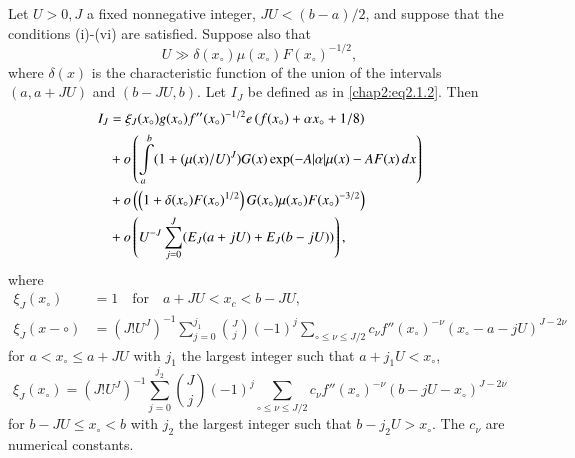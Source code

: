 \begin{thm}\label{chap2:thm2.2}
Let $U>0, J$ a fixed nonnegative integer, $JU<(b-a)/2$, and suppose
that the conditions (i)-(vi) are satisfied. Suppose also that 
\begin{equation}\label{chap2:eq2.1.10}
U\gg \delta(x_\circ)\mu(x_\circ)F(x_\circ)^{-1/2},
\end{equation}
where $\delta(x)$ is the characteristic function of the union of the
intervals $(a,a+JU)$ and $(b-JU,b)$. Let $I_J$ be defined as in
\eqref{chap2:eq2.1.2}. Then 
\begin{align}
I_J &= \xi_J(x_\circ)g(x_\circ)f''(x_\circ)^{-1/2}e\left(f(x_\circ)
+\alpha x_\circ+1/8\right)\label{chap2:eq2.1.11}\\
&+ o\left(\int\limits_a^b(1+(\mu(x)/U)^J)G(x)\exp(-A|\alpha|\mu (x)-AF
(x)\,dx\right)\notag\\
&+o\left(\left(1+\delta(x_\circ)F(x_\circ)^{1/2}\right)G(x_\circ)\mu
(x_\circ)F(x_\circ)^{-3/2}\right)\notag\\
& +o\left(U^{-J}\sum\limits_{j=0}^J(E_J(a+jU)+E_J(b-jU))\right),\notag
\end{align}\pageoriginale
where
\begin{align}
\xi_J(x_\circ) &= 1\quad\text{for}\quad
a+JU<x_c<b-JU,\label{chap2:eq2.1.12}\\
\xi_J(x-\circ) &= \left(J!U^J\right)^{-1}\sum\limits_{j=0}^{j_1}
\binom{J}{j}(-1)^j\sum\limits_{\circ\leq\nu\leq J/2}c_\nu f''
(x_\circ)^{-\nu}(x_\circ-a-jU)^{J-2\nu}\label{chap2:eq2.1.13}
\end{align}
for $a<x_\circ\leq a+JU$ with $j_1$ the largest integer such that
$a+j_1U<x_\circ$, 
\begin{equation}\label{chap2:eq2.1.14}
\xi_J(x_\circ)=(J!U^J)^{-1}\sum\limits_{j=0}^{j_2}\binom{J}{j}(-1)^j
\sum\limits_{\circ\leq\nu\leq J/2}c_\nu
f''(x_\circ)^{-\nu}(b-jU-x_\circ)^{J-2\nu} 
\end{equation}
for $b-JU\leq x_\circ < b$ with $j_2$ the largest integer such that
$b-j_2U>x_\circ$. The $c_\nu$ are numerical constants.
\end{thm}

